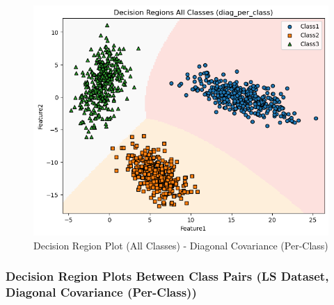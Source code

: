 \begin{figure}[H]
    \centering
    \includegraphics[width=\linewidth]{images/LS_Group04_images/03_diag_per_class/05_decision_region_all.png}
    \caption{Decision Region Plot (All Classes) - Diagonal Covariance (Per-Class)}
\end{figure}

\subsubsection{Decision Region Plots Between Class Pairs (LS Dataset, Diagonal Covariance (Per-Class))}


